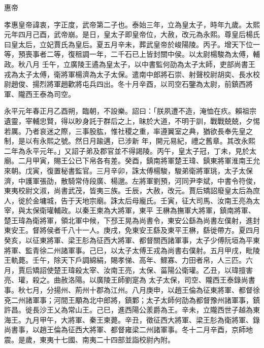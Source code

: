 
\begin{pinyinscope}

 惠帝



 孝惠皇帝諱衷，字正度，武帝第二子也。泰始三年，立為皇太子，時年九歲。太熙元年四月己酉，武帝崩。是日，皇太子即皇帝位，大赦，改元為永熙。尊皇后楊氏曰皇太后，立妃賈氏為皇后。夏五月辛未，葬武皇帝於峻陽陵。丙子。增天下位一等，預喪事者二等，復租調一年，二千石已上皆封關中侯。以太尉楊駿為太傅，輔政。秋八月
 壬午，立廣陵王遹為皇太子，以中書監何劭為太子太師，吏部尚書王戎為太子太傅，衛將軍楊濟為太子太保。遣南中郎將石崇、射聲校尉胡奕、長水校尉趙俊、揚烈將軍趙歡將屯兵四出。冬十月辛酉，以司空石鑒為太尉，前鎮西將軍、隴西王泰為司空。



 永平元年春正月乙酉朔，臨朝，不設樂。詔曰：「朕夙遭不造，淹恤在疚。賴祖宗遺靈，宰輔忠賢，得以眇身託于群后之上，昧於大道，不明于訓，戰戰兢兢，夕惕若厲。乃者哀迷之際，三事股肱，惟社稷之重，率遵翼室之典，猶欲長奉先皇之制，是以有永熙之號。然日月踰邁，已涉新
 年，開元易紀，禮之舊章。其改永熙二年為永平元年。」又詔子弟及郡官並不得謁陵。丙午，皇太子冠，丁未，見於太廟。二月甲寅，賜王公已下帛各有差。癸酉，鎮南將軍楚王瑋、鎮東將軍淮南王允來朝。戊寅，復置秘書監官。三月辛卯，誅太傅楊駿，駿弟衛將軍珧，太子太保濟，中護軍張劭，散騎常侍段廣、楊邈。左將軍劉預，河同尹李斌，中書令符俊，東夷校尉文淑，尚書武茂，皆夷三族。壬辰，大赦，改元。賈后矯詔廢皇太后為庶人，徙於金墉城，告于天地宗廟。誅太后母龐氏。壬寅，征大司馬、汝南王亮為太宰，與太保衛瓘輔政。以秦王柬為大將軍，東平
 王楙為撫軍大將軍，鎮南將軍、楚王瑋為衛將軍，領北軍中候，下邳王晃為尚書令，東安公繇為尚書左僕射，進封東安王。督將侯者千八十一人。庚戌，免東安王繇及東平王楙，繇徙帶方。夏四月癸亥，以征東將軍、梁王肜為征西大將軍、都督關西諸軍事，太子少傅阮垣為平東將軍、監青徐二州諸軍事。己巳，以太子太傅王戎為尚書右僕射。五月甲戌，毗陵王軌薨。壬午，除天下戶調綿絹，賜孝悌、高年、鰥寡、力田者帛，人三匹。六月，賈后矯詔使楚王瑋殺太宰、汝南王亮，太保、菑陽公衛瓘。乙丑，以瑋擅害亮、瓘，殺之。曲赦洛陽。以廣陵王師劉寔為
 太子太保，司空、隴西王泰錄尚書事。秋七月，分揚州、荊州十郡為江州。八月庚申，以趙王倫為征東將軍、都督徐兗二州諸軍事；河間王顒為北中郎將，鎮鄴；太子太師何劭為都督豫州諸軍事，鎮許昌。徙長沙王乂為常山王。己巳，進西陽公羕爵為王。辛未，立隴西世子越為東海王。九月甲午，大將軍、秦王柬薨。辛丑，徵征西大將軍、梁王肜為衛將軍、錄尚書事，以趙王倫為征西大將軍、都督雍梁二州諸軍事。冬十二月辛酉，京師地震。是歲，東夷十七國、南夷二十四部並詣校尉內附。




\end{pinyinscope}
